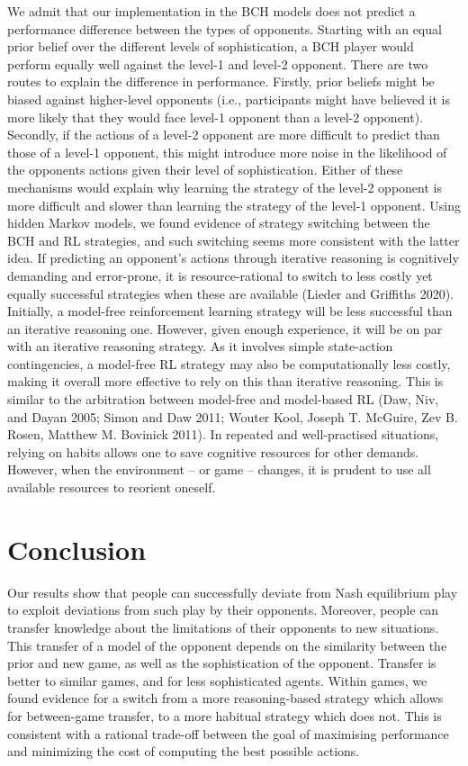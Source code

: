 \documentclass[smallextended]{svjour3}       %
\begin{document}
We admit that our implementation in the BCH models does not predict a
performance difference between the types of opponents. Starting with an
equal prior belief over the different levels of sophistication, a BCH
player would perform equally well against the level-1 and level-2
opponent. There are two routes to explain the difference in performance.
Firstly, prior beliefs might be biased against higher-level opponents
(i.e., participants might have believed it is more likely that they
would face level-1 opponent than a level-2 opponent). Secondly, if the
actions of a level-2 opponent are more difficult to predict than those
of a level-1 opponent, this might introduce more noise in the likelihood
of the opponents actions given their level of sophistication. Either of
these mechanisms would explain why learning the strategy of the level-2
opponent is more difficult and slower than learning the strategy of the
level-1 opponent. Using hidden Markov models, we found evidence of
strategy switching between the BCH and RL strategies, and such switching
seems more consistent with the latter idea. If predicting an opponent's
actions through iterative reasoning is cognitively demanding and
error-prone, it is resource-rational to switch to less costly yet
equally successful strategies when these are available (Lieder and
Griffiths 2020). Initially, a model-free reinforcement learning strategy
will be less successful than an iterative reasoning one. However, given
enough experience, it will be on par with an iterative reasoning
strategy. As it involves simple state-action contingencies, a model-free
RL strategy may also be computationally less costly, making it overall
more effective to rely on this than iterative reasoning. This is similar
to the arbitration between model-free and model-based RL (Daw, Niv, and
Dayan 2005; Simon and Daw 2011; Wouter Kool, Joseph T. McGuire, Zev B.
Rosen, Matthew M. Bovinick 2011). In repeated and well-practised
situations, relying on habits allows one to save cognitive resources for
other demands. However, when the environment -- or game -- changes, it
is prudent to use all available resources to reorient oneself.

\hypertarget{conclusion}{%
\section{Conclusion}\label{conclusion}}

Our results show that people can successfully deviate from Nash
equilibrium play to exploit deviations from such play by their
opponents. Moreover, people can transfer knowledge about the limitations
of their opponents to new situations. This transfer of a model of the
opponent depends on the similarity between the prior and new game, as
well as the sophistication of the opponent. Transfer is better to
similar games, and for less sophisticated agents. Within games, we found
evidence for a switch from a more reasoning-based strategy which allows
for between-game transfer, to a more habitual strategy which does not.
This is consistent with a rational trade-off between the goal of
maximising performance and minimizing the cost of computing the best
possible actions.
\end{document}
